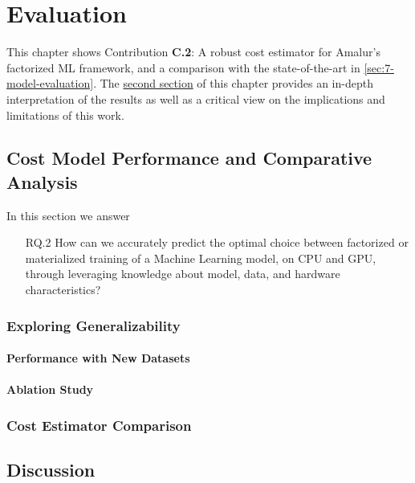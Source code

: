 
\chapter{Evaluation}
\label{chapter:evaluation-discussion}
This chapter shows Contribution \textbf{C.2}: A robust cost estimator for Amalur's factorized ML framework, and a comparison with the state-of-the-art in \autoref{sec:7-model-evaluation}. The \hyperref[sec:7-discussion]{second section} of this chapter provides an in-depth interpretation of the results as well as a critical view on the implications and limitations of this work.

\section{Cost Model Performance and Comparative Analysis}
\label{sec:7-model-evaluation}

In this section we answer
\begin{itemize}
    \item[RQ.2] How can we accurately predict the optimal choice between factorized or materialized training of a Machine Learning model, on CPU and GPU, through leveraging knowledge about model, data, and hardware characteristics?
\end{itemize}

\subsection{Exploring Generalizability}
\subsubsection{Performance with New Datasets}

\subsubsection{Ablation Study}



\subsection{Cost Estimator Comparison}


\section{Discussion}
\label{sec:7-discussion}

